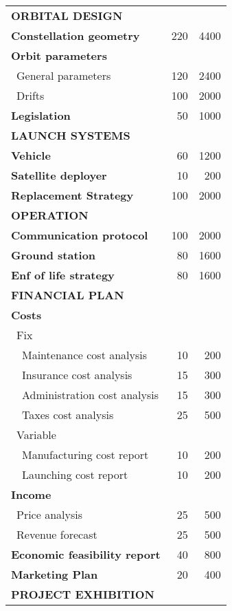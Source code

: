 \begin{longtable}{| l | r | r | }
\rowcolor[gray]{0.85}	\textbf{ORBITAL DESIGN} &  & \\

	\textbf{Constellation geometry} & 220  & 4400  \\
	\hline
	\textbf{Orbit parameters} &   &  \\
	   \blue ~General parameters & 120  & 2400  \\
	   \blue ~Drifts & 100 & 2000  \\
	\hline
	\textbf{Legislation} & 50 & 1000 \\
   
\rowcolor[gray]{0.85} \textbf{LAUNCH SYSTEMS} &  &   \\
	
	\textbf{Vehicle} & 60 & 1200 \\
	\hline
	\textbf{Satellite deployer} & 10  & 200 \\
	\hline
	\textbf{Replacement Strategy} & 100  & 2000 \\
	

\rowcolor[gray]{0.85} \textbf{OPERATION} &  &  \\
	
	\textbf{Communication protocol} & 100 & 2000\\
	\hline
	\textbf{Ground station} & 80 & 1600 \\
	\hline
	\textbf{Enf of life strategy} & 80  & 1600 \\
	\hline

\pagebreak

	\hline
\rowcolor[gray]{0.85} \textbf{FINANCIAL PLAN} &  & \\
	
	\textbf{Costs} & & \\
	   \blue ~Fix &  &   \\
	   ~~Maintenance cost analysis & 10 & 200 \\
	   ~~Insurance cost analysis & 15 & 300 \\
	   ~~Administration cost analysis & 15 & 300 \\
	   ~~Taxes cost analysis & 25 & 500 \\
	   \blue ~Variable &  &  \\
	   ~~Manufacturing cost report & 10 & 200 \\
	   ~~Launching cost report & 10 & 200 \\
	\hline
	\textbf{Income} &   &  \\
	   \blue ~Price analysis & 25  & 500  \\
	   \blue ~Revenue forecast & 25  & 500  \\
	\hline
	\textbf{Economic feasibility report} & 40 & 800 \\
	\hline
	\textbf{Marketing Plan} & 20 & 400 \\
\rowcolor[gray]{0.85} \textbf{PROJECT EXHIBITION} & &  \\


\end{longtable}
